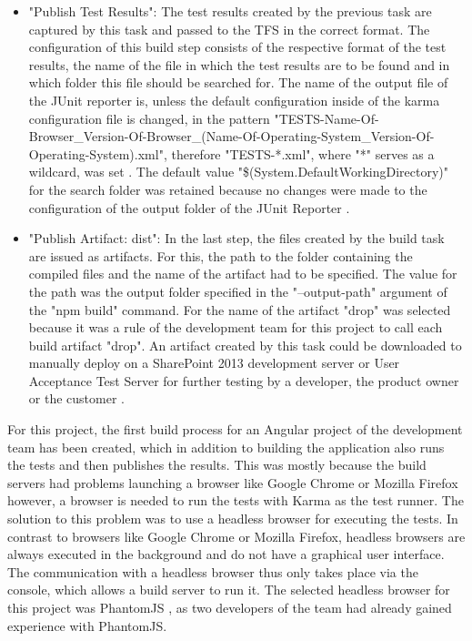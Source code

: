 \documentclass[Bachelor,BIF,english]{twbook}
\begin{document}
\begin{itemize}
\item "Publish Test Results": The test results created by the previous task are captured by this task and passed to the TFS in the correct format. The configuration of this build step consists of the respective format of the test results, the name of the file in which the test results are to be found and in which folder this file should be searched for. The name of the output file of the JUnit reporter is, unless the default configuration inside of the karma configuration file is changed, in the pattern "TESTS-Name-Of-Browser{\_}Version-Of-Browser{\_}(Name-Of-Operating-System{\_}Version-Of-Operating-System).xml", therefore "TESTS-*.xml", where "*" serves as a wildcard, was set \cite{KarmaJUnitReporterConfig}. The default value "\$(System.DefaultWorkingDirectory)" for the search folder was retained because no changes were made to the configuration of the output folder of the JUnit Reporter \cite{TFSPublishBuildArtifact}.
\item "Publish Artifact: dist": In the last step, the files created by the build task are issued as artifacts. For this, the path to the folder containing the compiled files and the name of the artifact had to be specified. The value for the path was the output folder specified in the "--output-path" argument of the "npm build" command. For the name of the artifact "drop" was selected because it was a rule of the development team for this project to call each build artifact "drop". An artifact created by this task could be downloaded to manually deploy on a SharePoint 2013 development server or User Acceptance Test Server for further testing by a developer, the product owner or the customer \cite{TFSPublishBuildArtifact}.
\end{itemize}
For this project, the first build process for an Angular project of the development team has been created, which in addition to building the application also runs the tests and then publishes the results. This was mostly because the build servers had problems launching a browser like Google Chrome \cite{Chrome} or Mozilla Firefox \cite{Firefox} however, a browser is needed to run the tests with Karma as the test runner. The solution to this problem was to use a headless browser \cite[p.~2]{HeadlessBrowser} for executing the tests. In contrast to browsers like Google Chrome or Mozilla Firefox, headless browsers are always executed in the background and do not have a graphical user interface. The communication with a headless browser thus only takes place via the console, which allows a build server to run it. The selected headless browser for this project was PhantomJS \cite{PhantomJS}, as two developers of the team had already gained experience with PhantomJS.
\end{document}
